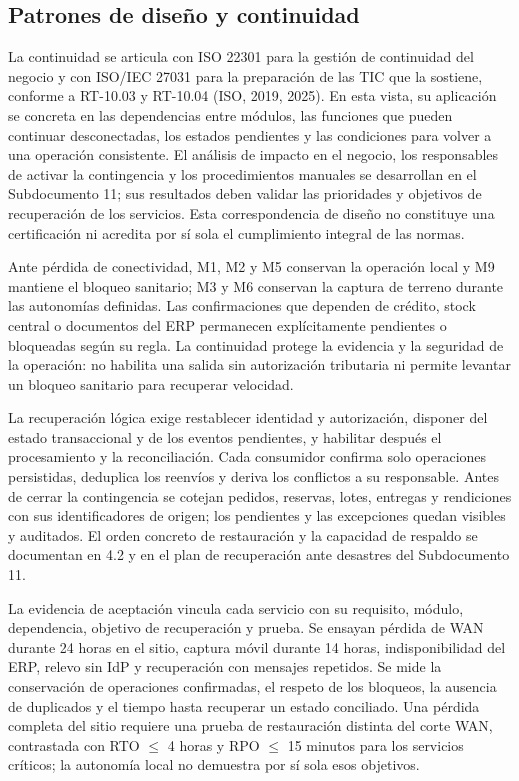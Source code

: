\subsection{Patrones de diseño y continuidad}

\label{sec:continuidad-logica}

La continuidad se articula con ISO 22301 para la gestión de continuidad del negocio y con ISO/IEC 27031 para la preparación de las TIC que la sostiene, conforme a RT-10.03 y RT-10.04 (ISO, 2019, 2025). En esta vista, su aplicación se concreta en las dependencias entre módulos, las funciones que pueden continuar desconectadas, los estados pendientes y las condiciones para volver a una operación consistente. El análisis de impacto en el negocio, los responsables de activar la contingencia y los procedimientos manuales se desarrollan en el Subdocumento 11; sus resultados deben validar las prioridades y objetivos de recuperación de los servicios. Esta correspondencia de diseño no constituye una certificación ni acredita por sí sola el cumplimiento integral de las normas.

Ante pérdida de conectividad, M1, M2 y M5 conservan la operación local y M9 mantiene el bloqueo sanitario; M3 y M6 conservan la captura de terreno durante las autonomías definidas. Las confirmaciones que dependen de crédito, stock central o documentos del ERP permanecen explícitamente pendientes o bloqueadas según su regla. La continuidad protege la evidencia y la seguridad de la operación: no habilita una salida sin autorización tributaria ni permite levantar un bloqueo sanitario para recuperar velocidad.

La recuperación lógica exige restablecer identidad y autorización, disponer del estado transaccional y de los eventos pendientes, y habilitar después el procesamiento y la reconciliación. Cada consumidor confirma solo operaciones persistidas, deduplica los reenvíos y deriva los conflictos a su responsable. Antes de cerrar la contingencia se cotejan pedidos, reservas, lotes, entregas y rendiciones con sus identificadores de origen; los pendientes y las excepciones quedan visibles y auditados. El orden concreto de restauración y la capacidad de respaldo se documentan en 4.2 y en el plan de recuperación ante desastres del Subdocumento 11.

La evidencia de aceptación vincula cada servicio con su requisito, módulo, dependencia, objetivo de recuperación y prueba. Se ensayan pérdida de WAN durante 24 horas en el sitio, captura móvil durante 14 horas, indisponibilidad del ERP, relevo sin IdP y recuperación con mensajes repetidos. Se mide la conservación de operaciones confirmadas, el respeto de los bloqueos, la ausencia de duplicados y el tiempo hasta recuperar un estado conciliado. Una pérdida completa del sitio requiere una prueba de restauración distinta del corte WAN, contrastada con RTO $\leq$ 4 horas y RPO $\leq$ 15 minutos para los servicios críticos; la autonomía local no demuestra por sí sola esos objetivos.

